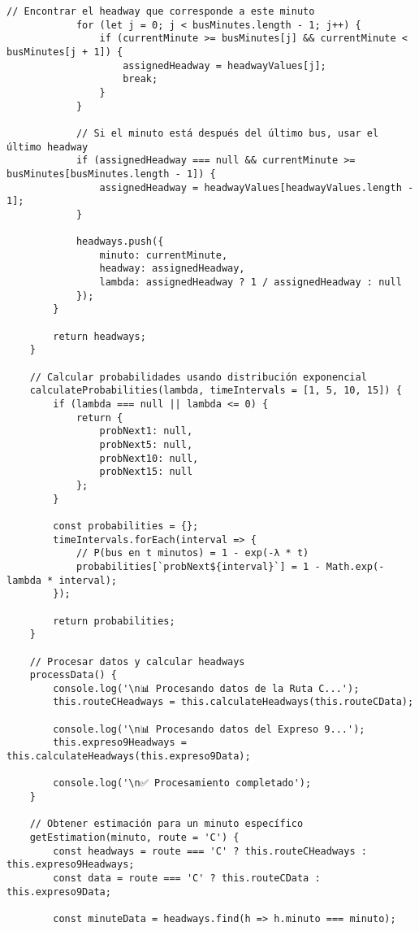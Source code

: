 \documentclass[12pt,a4paper]{article}
\begin{document}
\begin{lstlisting}[caption=bus-probability-estimator.js completo]
            // Encontrar el headway que corresponde a este minuto
            for (let j = 0; j < busMinutes.length - 1; j++) {
                if (currentMinute >= busMinutes[j] && currentMinute < busMinutes[j + 1]) {
                    assignedHeadway = headwayValues[j];
                    break;
                }
            }

            // Si el minuto está después del último bus, usar el último headway
            if (assignedHeadway === null && currentMinute >= busMinutes[busMinutes.length - 1]) {
                assignedHeadway = headwayValues[headwayValues.length - 1];
            }

            headways.push({
                minuto: currentMinute,
                headway: assignedHeadway,
                lambda: assignedHeadway ? 1 / assignedHeadway : null
            });
        }

        return headways;
    }

    // Calcular probabilidades usando distribución exponencial
    calculateProbabilities(lambda, timeIntervals = [1, 5, 10, 15]) {
        if (lambda === null || lambda <= 0) {
            return {
                probNext1: null,
                probNext5: null,
                probNext10: null,
                probNext15: null
            };
        }

        const probabilities = {};
        timeIntervals.forEach(interval => {
            // P(bus en t minutos) = 1 - exp(-λ * t)
            probabilities[`probNext${interval}`] = 1 - Math.exp(-lambda * interval);
        });

        return probabilities;
    }

    // Procesar datos y calcular headways
    processData() {
        console.log('\n📊 Procesando datos de la Ruta C...');
        this.routeCHeadways = this.calculateHeadways(this.routeCData);

        console.log('\n📊 Procesando datos del Expreso 9...');
        this.expreso9Headways = this.calculateHeadways(this.expreso9Data);

        console.log('\n✅ Procesamiento completado');
    }

    // Obtener estimación para un minuto específico
    getEstimation(minuto, route = 'C') {
        const headways = route === 'C' ? this.routeCHeadways : this.expreso9Headways;
        const data = route === 'C' ? this.routeCData : this.expreso9Data;
        
        const minuteData = headways.find(h => h.minuto === minuto);
        

\end{lstlisting}
\end{document}
